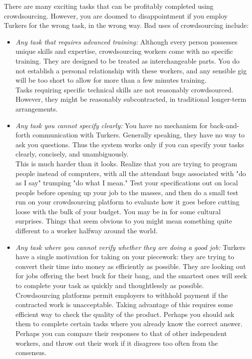 \documentclass[10pt]{article}
\begin{document}
There are many exciting tasks that can be profitably completed using crowdsourcing. However, you are doomed to disappointment if you employ Turkers for the wrong task, in the wrong way. Bad uses of crowdsourcing include:

\begin{itemize}
    \item \textit{Any task that requires advanced training:} Although every person possesses unique skills and expertise, crowdsourcing workers come with no specific training. They are designed to be treated as interchangeable parts. You do not establish a personal relationship with these workers, and any sensible gig will be too short to allow for more than a few minutes training.\\
          Tasks requiring specific technical skills are not reasonably crowdsourced. However, they might be reasonably subcontracted, in traditional longer-term arrangements.
    \item \textit{Any task you cannot specify clearly:} You have no mechanism for back-and-forth communication with Turkers. Generally speaking, they have no way to ask you questions. Thus the system works only if you can specify your tasks clearly, concisely, and unambiguously.\\
          This is much harder than it looks. Realize that you are trying to program people instead of computers, with all the attendant bugs associated with "do as I say" trumping "do what I mean." Test your specifications out on local people before opening up your job to the masses, and then do a small test run on your crowdsourcing platform to evaluate how it goes before cutting loose with the bulk of your budget. You may be in for some cultural surprises. Things that seem obvious to you might mean something quite different to a worker halfway around the world.
    \item \textit{Any task where you cannot verify whether they are doing a good job:} Turkers have a single motivation for taking on your piecework: they are trying to convert their time into money as efficiently as possible. They are looking out for jobs offering the best buck for their bang, and the smartest ones will seek to complete your task as quickly and thoughtlessly as possible.\\
          Crowdsourcing platforms permit employers to withhold payment if the contracted work is unacceptable. Taking advantage of this requires some efficient way to check the quality of the product. Perhaps you should ask them to complete certain tasks where you already know the correct answer. Perhaps you can compare their responses to that of other independent workers, and throw out their work if it disagrees too often from the consensus.

\end{itemize}
\end{document}
